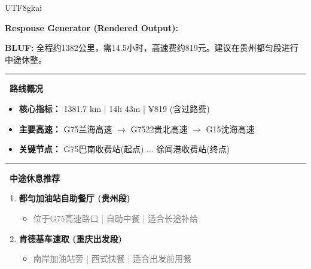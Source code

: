 \begin{CJK*}{UTF8}{gkai}
\begin{tcolorbox}[
    breakable,
    enhanced,
    colframe=color_amapblue,
    colback=mycolor,
    coltitle=white,
    title = {\textbf{Case Study: Cross-province Self-driving Guide}},
    fonttitle=\bfseries
]
\vspace{5pt}

\textbf{Response Generator (Rendered Output):}
\begin{tcolorbox}[colback=white, colframe=color_amapblue!30!white, arc=4pt, boxrule=1pt, left=4pt, right=4pt, top=4pt, bottom=4pt]
    \small
    \textbf{BLUF:} 全程约1382公里，需14.5小时，高速费约819元。建议在贵州都匀段进行中途休整。
    
    \par\noindent\rule{\textwidth}{0.4pt}
    
    \textbf{\textcolor{color_amapblue}{\faRoad\ 路线概况}}
    \begin{itemize}[leftmargin=12pt, itemsep=2pt, topsep=2pt]
        \item \textbf{核心指标：} 1381.7 km | 14h 43m | ¥819 (含过路费)
        \item \textbf{主要高速：} G75兰海高速 $\rightarrow$ G7522贵北高速 $\rightarrow$ G15沈海高速
        \item \textbf{关键节点：} G75巴南收费站(起点) ... 徐闻港收费站(终点)
    \end{itemize}
    
    \par\noindent\rule{\textwidth}{0.4pt}
    
    \textbf{\textcolor{color_amapblue}{\faCoffee\ 中途休息推荐}}
    \begin{enumerate}[leftmargin=12pt, itemsep=2pt, topsep=2pt]
        \item \textbf{都匀加油站自助餐厅 (贵州段)}
        \begin{itemize}[leftmargin=6pt, label={}, itemsep=0pt]
            \item \scriptsize \textcolor{gray}{位于G75高速路口 | 自助中餐 | 适合长途补给}
        \end{itemize}
        \item \textbf{肯德基车速取 (重庆出发段)}
        \begin{itemize}[leftmargin=6pt, label={}, itemsep=0pt]
            \item \scriptsize \textcolor{gray}{南岸加油站旁 | 西式快餐 | 适合出发前用餐}
        \end{itemize}
    \end{enumerate}
    
    \vspace{3pt}
    

\end{tcolorbox}
\end{tcolorbox}
\end{CJK*}
